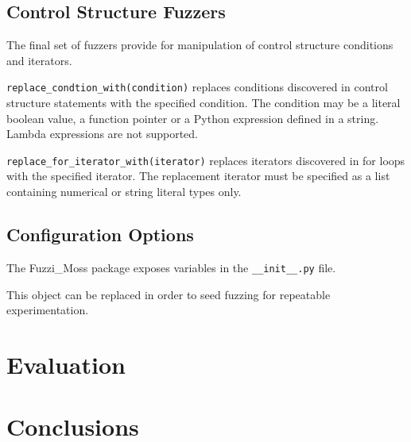 \documentclass{sig-alternate}
\newenvironment{FunctionList}{%
\lstset{basicstyle=\ttfamily\bfseries\small}
\begin{list}{}{\leftmargin=5pt}
}{\end{list}\lstset{basicstyle=\ttfamily\small}}
\begin{document}

\subsection{Control Structure Fuzzers}


The final set of fuzzers provide for manipulation of control structure
conditions and iterators.  

\begin{FunctionList}

\item \lstinline!replace_condtion_with(condition)! replaces conditions
  discovered in control structure statements with the specified condition.  The
  condition may be a literal boolean value, a function pointer or a Python
  expression defined in a string.  Lambda expressions are not supported.

\item \lstinline!replace_for_iterator_with(iterator)! replaces iterators
  discovered in for loops with the specified iterator.  The replacement iterator
  must be specified as a list containing numerical or string literal types only.

\end{FunctionList}


\subsection{Configuration Options}


The Fuzzi\_Moss package exposes variables in the \verb!__init__.py! file.

  This
  object can be replaced in order to seed fuzzing for repeatable
  experimentation.


\section{Evaluation}



\section{Conclusions}






\end{document}
